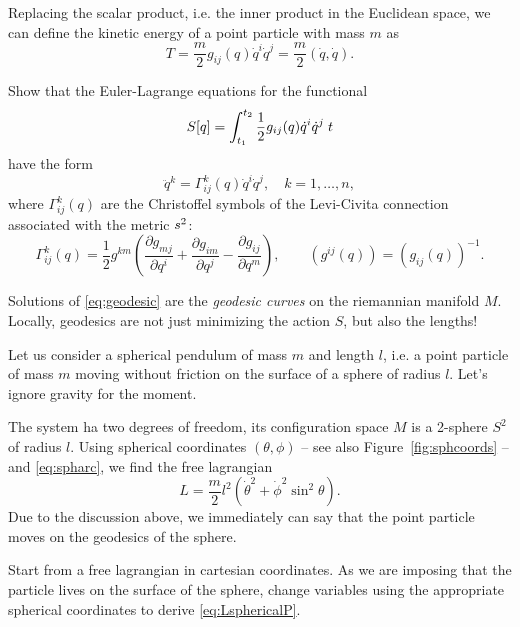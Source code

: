 \documentclass[english,fontsize=11pt,paper=a5,oneside]{scrbook}
\let\d\relax
\DeclareMathOperator{\d}{d}
\theoremstyle{definition}
\newenvironment{example}
  {\pushQED{\qed}\renewcommand{\qedsymbol}{$\lozenge$}\examplex}
  {\popQED\endexamplex}
\newenvironment{exercise}
  {\pushQED{\qed}\renewcommand{\qedsymbol}{$\maltese$}\exercisex}
  {\popQED\endexercisex}
\begin{document}
Replacing the scalar product, i.e. the inner product in the Euclidean space, we can define the kinetic energy of a point particle with mass $m$ as
\begin{equation}
    T = \frac{m}2 g_{ij}(q)\dot q^i\dot q^j = \frac m2 (\dot q, \dot q).
\end{equation}

\begin{exercise}\label{exe:geodesic1}
    Show that the Euler-Lagrange equations for the functional
    \begin{equation}
        S[q] = \int_{t_1}^{t_2} \frac 12 g_{ij}(q) \dot q^i \dot q^j\; \d t
    \end{equation}
    have the form
    \begin{equation}\label{eq:geodesic}
        \ddot q^k = \Gamma_{ij}^k(q) \dot q^i \dot q^j, \quad k=1,\ldots, n,
    \end{equation}
    where $\Gamma_{ij}^k(q)$ are the Christoffel symbols of the Levi-Civita connection associated with the metric $\d s^2$:
    \begin{equation}
        \Gamma_{ij}^k(q) = \frac12 g^{km}\left(
            \frac{\partial g_{mj}}{\partial q^i} + \frac{\partial g_{im}}{\partial q^j}-\frac{\partial g_{ij}}{\partial q^m}
            \right),
        \qquad (g^{ij}(q)) = (g_{ij}(q))^{-1}.
    \end{equation}
\end{exercise}

Solutions of \eqref{eq:geodesic} are the \emph{geodesic curves} on the riemannian manifold $M$. Locally, geodesics are not just minimizing the action $S$, but also the lengths!

\begin{example}\label{ex:sphericalP}
    Let us consider a spherical pendulum of mass $m$ and length $l$, i.e. a point particle of mass $m$ moving without friction on the surface of a sphere of radius $l$.
    Let's ignore gravity for the moment.
    
    The system ha two degrees of freedom, its configuration space $M$ is a 2-sphere $S^2$ of radius $l$.
    Using spherical coordinates $(\theta, \phi)$ -- see also Figure~\ref{fig:sphcoords} -- and \eqref{eq:spharc}, we find the free lagrangian
    \begin{equation}\label{eq:LsphericalP}
        L = \frac m2 l^2(\dot \theta^2 + \dot \phi^2 \sin^2\theta).
    \end{equation}
    Due to the discussion above, we immediately can say that the point particle moves on the geodesics of the sphere.

    \begin{exercise}
        Start from a free lagrangian in cartesian coordinates.
        As we are imposing that the particle lives on the surface of the sphere, change variables using the appropriate spherical coordinates to derive \eqref{eq:LsphericalP}.
    \end{exercise}
\end{example}
\end{document}
